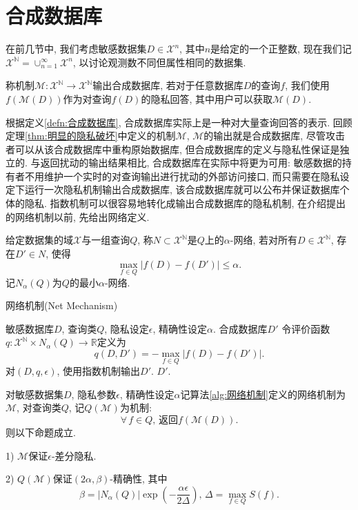 \section{合成数据库} %
\label{sec:合成数据库}
在前几节中, 我们考虑敏感数据集$D \in \mathcal{X}^n$, 其中$n$是给定的一个正整数, 现在我们记$\mathcal{X}^{\mathbb N} = \cup_{n=1}^\infty \mathcal{X}^n$, 以讨论观测数不同但属性相同的数据集.
\begin{defn}[合成数据库]\label{defn:合成数据库}
  称机制$\mathcal{M}\colon\mathcal{X}^{\mathbb N}\to\mathcal{X}^{\mathbb N}$输出合成数据库, 若对于任意数据库$D$的查询$f$, 我们使用$f(\mathcal{M}(D))$作为对查询$f(D)$的隐私回答, 其中用户可以获取$\mathcal{M}(D)$.
\end{defn}
根据定义\ref{defn:合成数据库}, 合成数据库实际上是一种对大量查询回答的表示. 回顾定理\ref{thm:明显的隐私破坏}中定义的机制$\mathcal{M}$, $\mathcal{M}$的输出就是合成数据库, 尽管攻击者可以从该合成数据库中重构原始数据库, 但合成数据库的定义与隐私性保证是独立的. 与返回扰动的输出结果相比, 合成数据库在实际中将更为可用: 敏感数据的持有者不用维护一个实时的对查询输出进行扰动的外部访问接口, 而只需要在隐私设定下运行一次隐私机制输出合成数据库, 该合成数据库就可以公布并保证数据库个体的隐私. 指数机制可以很容易地转化成输出合成数据库的隐私机制, 在介绍\parencite{blum2013learning}提出的网络机制以前, 先给出网络定义.
\begin{defn}[$\alpha$-网络]\label{defn:alpha-网络}
  给定数据集的域$\mathcal{X}$与一组查询$Q$, 称$N \subset \mathcal{X}^{\mathbb N}$是$Q$上的$\alpha$-网络, 若对所有$D\in\mathcal{X}^{\mathbb N}$, 存在$D' \in N$, 使得
  \[
    \max_{f\in Q}|f(D) - f(D')| \le \alpha.
  \]
  记$N_\alpha(Q)$为$Q$的最小$\alpha$-网络. 
\end{defn}
\begin{algorithm}[hbtp]
  \caption{网络机制(Net Mechanism)}\label{alg:网络机制}
  \begin{algorithmic}
    \REQUIRE 敏感数据库$D$, 查询类$Q$, 隐私设定$\epsilon$, 精确性设定$\alpha$.
    \ENSURE 合成数据库$D'$
    \STATE 令评价函数$q\colon \mathcal{X}^{\mathbb N} \times N_\alpha(Q) \to \mathbb R$定义为
    \[
      q(D, D') = -\max_{f\in Q}|f(D) - f(D')|.
    \]
    \STATE 对$(D, q, \epsilon)$, 使用指数机制输出$D'$.
    \RETURN $D'$.
  \end{algorithmic}
\end{algorithm}
\begin{thm}[网络机制的隐私性与精确性]\label{thm:网络机制的隐私性与精确性}
  对敏感数据集$D$, 隐私参数$\epsilon$, 精确性设定$\alpha$记算法\ref{alg:网络机制}定义的网络机制为$\mathcal{M}$, 对查询类$Q$, 记$Q(\mathcal{M})$为机制: 
  \[
    \forall\,f\in Q,\, \text{返回$f(\mathcal{M}(D))$}. 
  \]
  则以下命题成立.
  
  1) $\mathcal{M}$保证$\epsilon$-差分隐私.
  
  2) $Q(\mathcal{M})$保证$(2\alpha, \beta)$-精确性, 其中
    \[
      \beta = |N_\alpha(Q)|\exp\left(-\frac{\alpha\epsilon}{2\Delta}\right),\, \Delta = \max_{f\in Q} S(f).
    \]
\end{thm}

